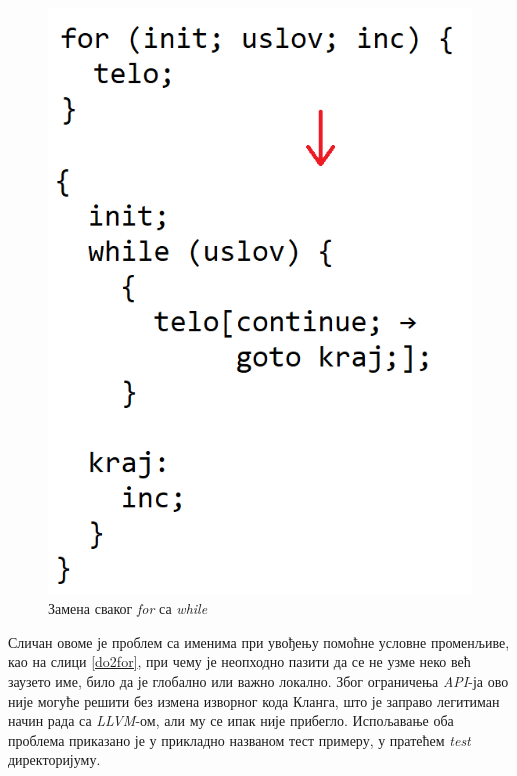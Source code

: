 \documentclass[a4paper]{article}
\begin{document}
\begin{figure}[h!]
\begin{center}
\includegraphics[scale=0.57]{for2while2}
\end{center}
\caption{Замена сваког \textit{for} са \textit{while}}
\label{for2while2}
\end{figure}

Сличан овоме је проблем са именима при увођењу помоћне условне променљиве, као на слици \ref{do2for}, при чему је неопходно пазити да се не узме неко већ заузето име, било да је глобално или важно локално. Због ограничења \textit{API}-ја ово није могуће решити без измена изворног кода Кланга, што је заправо легитиман начин рада са \textit{LLVM}-ом, али му се ипак није прибегло. Испољавање оба проблема приказано је у прикладно названом тест примеру, у пратећем \textit{test} директоријуму.
\end{document}
